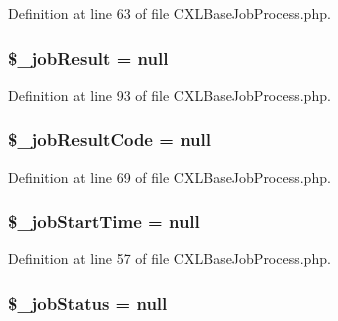 Definition at line 63 of file CXLBaseJobProcess.php.

\hypertarget{classCXLBaseJobProcess_a504977cfa0547a593dc7348ee17eb649}{
\subsubsection[{\$\_\-jobResult}]{\setlength{\rightskip}{0pt plus 5cm}\$\_\-jobResult = null}}
\label{classCXLBaseJobProcess_a504977cfa0547a593dc7348ee17eb649}


Definition at line 93 of file CXLBaseJobProcess.php.

\hypertarget{classCXLBaseJobProcess_a526a96330f81ef18dbd9910683b56834}{
\subsubsection[{\$\_\-jobResultCode}]{\setlength{\rightskip}{0pt plus 5cm}\$\_\-jobResultCode = null}}
\label{classCXLBaseJobProcess_a526a96330f81ef18dbd9910683b56834}


Definition at line 69 of file CXLBaseJobProcess.php.

\hypertarget{classCXLBaseJobProcess_ae0031ff175d62e0ad13e166945cf8701}{
\subsubsection[{\$\_\-jobStartTime}]{\setlength{\rightskip}{0pt plus 5cm}\$\_\-jobStartTime = null}}
\label{classCXLBaseJobProcess_ae0031ff175d62e0ad13e166945cf8701}


Definition at line 57 of file CXLBaseJobProcess.php.

\hypertarget{classCXLBaseJobProcess_a86923e2a1f9dcf7410f4d0281dec80b8}{
\subsubsection[{\$\_\-jobStatus}]{\setlength{\rightskip}{0pt plus 5cm}\$\_\-jobStatus = null}}
\label{classCXLBaseJobProcess_a86923e2a1f9dcf7410f4d0281dec80b8}


